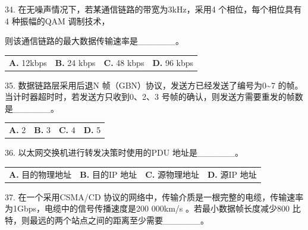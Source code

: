 \documentclass[UTF8,11pt]{ctexart}
\begin{document}
34. 在无噪声情况下，若某通信链路的带宽为3kHz，采用4 个相位，每个相位具有4 种振幅的QAM 调制技术，


则该通信链路的最大数据传输速率是\_\_\_\_\_\_。


\begin{center}\begin{tabular}{>{\raggedright\arraybackslash}p{\dimexpr(\linewidth-8\tabcolsep)/4\relax}>{\raggedright\arraybackslash}p{\dimexpr(\linewidth-8\tabcolsep)/4\relax}>{\raggedright\arraybackslash}p{\dimexpr(\linewidth-8\tabcolsep)/4\relax}>{\raggedright\arraybackslash}p{\dimexpr(\linewidth-8\tabcolsep)/4\relax}}
\textbf{A.} 12kbps & \textbf{B.} 24 kbps & \textbf{C.} 48 kbps & \textbf{D.} 96 kbps\\[.35em]\end{tabular}\end{center}

35. 数据链路层采用后退N 帧（GBN）协议，发送方已经发送了编号为0\textasciitilde{}7 的帧。当计时器超时时，若发送方只收到0、2、3 号帧的确认，则发送方需要重发的帧数是\_\_\_\_\_\_。


\begin{center}\begin{tabular}{>{\raggedright\arraybackslash}p{\dimexpr(\linewidth-8\tabcolsep)/4\relax}>{\raggedright\arraybackslash}p{\dimexpr(\linewidth-8\tabcolsep)/4\relax}>{\raggedright\arraybackslash}p{\dimexpr(\linewidth-8\tabcolsep)/4\relax}>{\raggedright\arraybackslash}p{\dimexpr(\linewidth-8\tabcolsep)/4\relax}}
\textbf{A.} 2 & \textbf{B.} 3 & \textbf{C.} 4 & \textbf{D.} 5\\[.35em]\end{tabular}\end{center}

36. 以太网交换机进行转发决策时使用的PDU 地址是\_\_\_\_\_\_。


\begin{center}\begin{tabular}{>{\raggedright\arraybackslash}p{\dimexpr(\linewidth-8\tabcolsep)/4\relax}>{\raggedright\arraybackslash}p{\dimexpr(\linewidth-8\tabcolsep)/4\relax}>{\raggedright\arraybackslash}p{\dimexpr(\linewidth-8\tabcolsep)/4\relax}>{\raggedright\arraybackslash}p{\dimexpr(\linewidth-8\tabcolsep)/4\relax}}
\textbf{A.} 目的物理地址 & \textbf{B.} 目的IP 地址 & \textbf{C.} 源物理地址 & \textbf{D.} 源IP 地址\\[.35em]\end{tabular}\end{center}

37. 在一个采用CSMA/CD 协议的网络中，传输介质是一根完整的电缆，传输速率为1Gbps，电缆中的信号传播速度是200 000km/s 。若最小数据帧长度减少800 比特，则最远的两个站点之间的距离至少需要\_\_\_\_\_\_。
\end{document}

